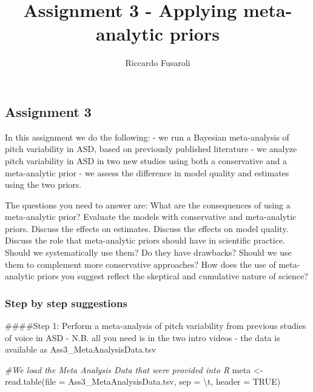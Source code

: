 \documentclass[
]{article}
\title{Assignment 3 - Applying meta-analytic priors}
\author{Riccardo Fusaroli}
\date{}
\newenvironment{Shaded}{\begin{snugshade}}{\end{snugshade}}
\newcommand{\AttributeTok}[1]{\textcolor[rgb]{0.77,0.63,0.00}{#1}}
\newcommand{\CommentTok}[1]{\textcolor[rgb]{0.56,0.35,0.01}{\textit{#1}}}
\newcommand{\ConstantTok}[1]{\textcolor[rgb]{0.00,0.00,0.00}{#1}}
\newcommand{\FunctionTok}[1]{\textcolor[rgb]{0.00,0.00,0.00}{#1}}
\newcommand{\NormalTok}[1]{#1}
\newcommand{\OtherTok}[1]{\textcolor[rgb]{0.56,0.35,0.01}{#1}}
\newcommand{\SpecialCharTok}[1]{\textcolor[rgb]{0.00,0.00,0.00}{#1}}
\newcommand{\StringTok}[1]{\textcolor[rgb]{0.31,0.60,0.02}{#1}}
\begin{document}
\maketitle

\hypertarget{assignment-3}{%
\subsection{Assignment 3}\label{assignment-3}}

In this assignment we do the following: - we run a Bayesian
meta-analysis of pitch variability in ASD, based on previously published
literature - we analyze pitch variability in ASD in two new studies
using both a conservative and a meta-analytic prior - we assess the
difference in model quality and estimates using the two priors.

The questions you need to answer are: What are the consequences of using
a meta-analytic prior? Evaluate the models with conservative and
meta-analytic priors. Discuss the effects on estimates. Discuss the
effects on model quality. Discuss the role that meta-analytic priors
should have in scientific practice. Should we systematically use them?
Do they have drawbacks? Should we use them to complement more
conservative approaches? How does the use of meta-analytic priors you
suggest reflect the skeptical and cumulative nature of science?

\hypertarget{step-by-step-suggestions}{%
\subsubsection{Step by step
suggestions}\label{step-by-step-suggestions}}

\#\#\#\#Step 1: Perform a meta-analysis of pitch variability from
previous studies of voice in ASD - N.B. all you need is in the two intro
videos - the data is available as Ass3\_MetaAnalysisData.tsv

\begin{Shaded}
\begin{Highlighting}[]
\CommentTok{\#We load the Meta Analysis Data that were provided into R}
\NormalTok{meta }\OtherTok{\textless{}{-}} \FunctionTok{read.table}\NormalTok{(}\AttributeTok{file =} \StringTok{\textquotesingle{}Ass3\_MetaAnalysisData.tsv\textquotesingle{}}\NormalTok{, }\AttributeTok{sep =} \StringTok{\textquotesingle{}}\SpecialCharTok{\textbackslash{}t}\StringTok{\textquotesingle{}}\NormalTok{, }\AttributeTok{header =} \ConstantTok{TRUE}\NormalTok{)}
\end{Highlighting}
\end{Shaded}
\end{document}
